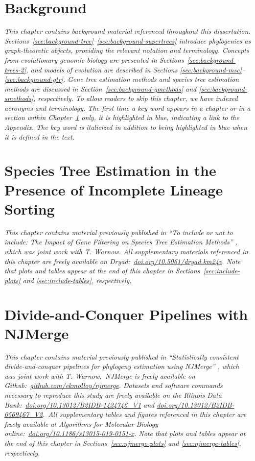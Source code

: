 \documentclass[tocnosub, noragright, centerchapter, fullpagesingle, 12pt]{uiuc_csthesis18}
\theoremstyle{definition}
\numberwithin{algocf}{chapter}     %
\begin{document}
\chapter{Background}
\label{chapter:background}
{\em This chapter contains background material referenced throughout this dissertation.
Sections~\ref{sec:background-tree}--\ref{sec:background-supertrees} introduce phylogenies as graph-theoretic objects, providing the relevant notation and terminology.
Concepts from evolutionary genomic biology are presented in Sections~\ref{sec:background-trees-2}, and models of evolution are described in Sections \ref{sec:background-msc}--\ref{sec:background-gtr}.
Gene tree estimation methods and species tree estimation methods are discussed in Section~\ref{sec:background-gmethods} and \ref{sec:background-smethods}, respectively.
To allow readers to skip this chapter, we have indexed acronyms and terminology.
The first time a key word appears in a chapter or in a section within Chapter~\ref{chapter:background} only, it is highlighted in blue, indicating a link to the Appendix.
The key word is italicized in addition to being highlighted in blue when it is defined in the text.}


\chapter{Species Tree Estimation in the Presence of Incomplete Lineage Sorting}
\label{chapter:include}
{\em This chapter contains material previously published in ``To include or not to include: The Impact of Gene Filtering on Species Tree Estimation Methods'' \cite{molloy2018include}, which was joint work with T. Warnow. 
All supplementary materials referenced in this chapter are freely available on Dryad:~\href{https://doi.org/10.5061/dryad.km24v}{doi.org/10.5061/dryad.km24v}.
Note that plots and tables appear at the end of this chapter in Sections~\ref{sec:include-plots} and \ref{sec:include-tables}, respectively.}


\chapter{Divide-and-Conquer Pipelines with NJMerge}
\label{chapter:njmerge}
\textit{This chapter contains material previously published in ``Statistically consistent divide-and-conquer pipelines for phylogeny estimation using NJMerge'' \cite{molloy2019statistically}, which was joint work with T. Warnow.~\emph{NJMerge} is freely available on Github:~\href{https://github.com/ekmolloy/njmerge}{github.com/ekmolloy/njmerge}.
Datasets and software commands necessary to reproduce this study are freely available on the Illinois Data Bank:~\href{https://doi.org/10.13012/B2IDB-1424746_V1}{doi.org/10.13012/B2IDB-1424746\_V1} and \href{https://doi.org/10.13012/B2IDB-0569467_V2}{doi.org/10.13012/B2IDB-0569467\_V2}.~All supplementary tables and figures referenced in this chapter are freely available at {\em Algorithms for Molecular Biology} online:~\href{https://doi.org/10.1186/s13015-019-0151-x}{doi.org/10.1186/s13015-019-0151-x}. 
Note that plots and tables appear at the end of this chapter in Sections~\ref{sec:njmerge-plots} and \ref{sec:njmerge-tables}, respectively.}

\end{document}

